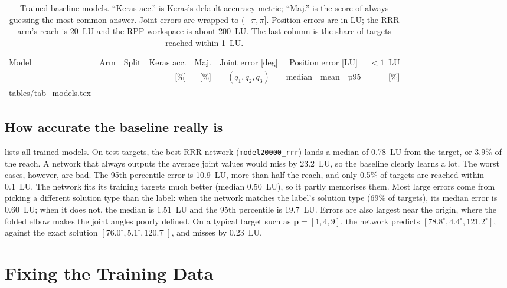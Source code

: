 \documentclass[conference]{IEEEtran}
\makeatletter
\newcommand{\tabinput}[1]{\@@input #1 }
\newcommand{\p}{\mathbf{p}}
\newcommand{\code}[1]{\texttt{#1}}
\makeatother
\begin{document}
\begin{table}[t]
\centering
\small
\setlength{\tabcolsep}{4pt}
\caption{Trained baseline models. ``Keras acc.'' is Keras's default accuracy metric; ``Maj.'' is the score of always guessing the most common answer. Joint errors are wrapped to $(-\pi,\pi]$. Position errors are in LU; the RRR arm's reach is 20~LU and the RPP workspace is about 200~LU. The last column is the share of targets reached within 1~LU.}
\label{tab:models}
\begin{tabular}{lllrrcrrrr}
\toprule
Model & Arm & Split & Keras acc. & Maj. & Joint error [deg] & \multicolumn{3}{c}{Position error [LU]} & $<1$~LU \\
\cmidrule(lr){7-9}
 & & & [\%] & [\%] & $(q_1,q_2,q_3)$ & median & mean & p95 & [\%] \\
\midrule
\tabinput{tables/tab_models.tex}
\bottomrule
\end{tabular}
\end{table}

\subsection{How accurate the baseline really is}
 lists all trained models. On test targets, the best RRR network (\code{model20000\_rrr}) lands a median of 0.78~LU from the target, or 3.9\% of the reach. A network that always outputs the average joint values would miss by 23.2~LU, so the baseline clearly learns a lot. The worst cases, however, are bad. The 95th-percentile error is 10.9~LU, more than half the reach, and only 0.5\% of targets are reached within 0.1~LU. The network fits its training targets much better (median 0.50~LU), so it partly memorises them. Most large errors come from picking a different solution type than the label: when the network matches the label's solution type (69\% of targets), its median error is 0.60~LU; when it does not, the median is 1.51~LU and the 95th percentile is 19.7~LU. Errors are also largest near the origin, where the folded elbow makes the joint angles poorly defined. On a typical target such as $\p=[1,4,9]$, the network predicts $[78.8^\circ, 4.4^\circ, 121.2^\circ]$, against the exact solution $[76.0^\circ, 5.1^\circ, 120.7^\circ]$, and misses by 0.23~LU.

\section{Fixing the Training Data}
\label{sec:fixes}
\end{document}
